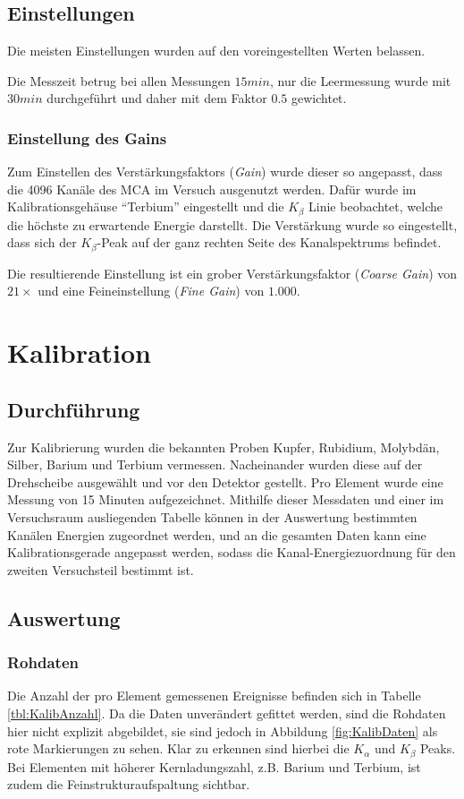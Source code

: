 \documentclass{../Misc/MontavonLaTeX/Montavon}
\begin{document}
\subsection{Einstellungen}
Die meisten Einstellungen wurden auf den voreingestellten Werten belassen.

Die Messzeit betrug bei allen Messungen $15 \unit{min}$, nur die Leermessung wurde mit $30 \unit{min}$ durchgeführt und daher mit dem Faktor $0.5$ gewichtet.

\subsubsection{Einstellung des Gains}
Zum Einstellen des Verstärkungsfaktors (\emph{Gain}) wurde dieser so angepasst, dass die 4096 Kanäle des MCA im Versuch ausgenutzt werden. Dafür wurde im Kalibrationsgehäuse \enquote{Terbium} eingestellt und die $K_\beta$ Linie beobachtet, welche die höchste zu erwartende Energie darstellt. Die Verstärkung wurde so eingestellt, dass sich der $K_\beta$-Peak auf der ganz rechten Seite des Kanalspektrums befindet.

Die resultierende Einstellung ist ein grober Verstärkungsfaktor (\emph{Coarse Gain}) von $21 \times$ und eine Feineinstellung (\emph{Fine Gain}) von $1.000$. 

\section{Kalibration}
\subsection{Durchführung}
Zur Kalibrierung wurden die bekannten Proben Kupfer, Rubidium, Molybdän, Silber, Barium und Terbium vermessen. Nacheinander wurden diese auf der Drehscheibe ausgewählt und vor den Detektor gestellt. Pro Element wurde eine Messung von 15 Minuten aufgezeichnet. 
Mithilfe dieser Messdaten und einer im Versuchsraum ausliegenden Tabelle können in der Auswertung bestimmten Kanälen Energien zugeordnet werden, und an die gesamten Daten kann eine Kalibrationsgerade angepasst werden, sodass die Kanal-Energiezuordnung für den zweiten Versuchsteil bestimmt ist.

\subsection{Auswertung}

\subsubsection{Rohdaten}
Die Anzahl der pro Element gemessenen Ereignisse befinden sich in Tabelle \ref{tbl:KalibAnzahl}. Da die Daten unverändert gefittet werden, sind die Rohdaten hier nicht explizit abgebildet, sie sind jedoch in Abbildung \ref{fig:KalibDaten} als rote Markierungen zu sehen.  Klar zu erkennen sind hierbei die $K_\alpha$ und $K_\beta$ Peaks. Bei Elementen mit höherer Kernladungszahl, z.B. Barium und Terbium, ist zudem die Feinstrukturaufspaltung sichtbar.
\end{document}

